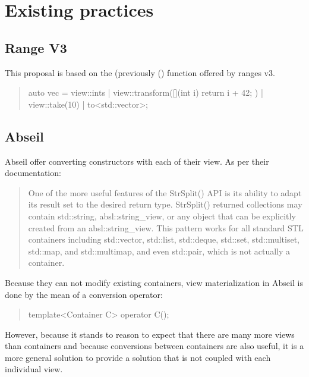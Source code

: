 \documentclass{wg21}
\begin{document}
\section{Existing practices}


\subsection{Range V3}

This proposal is based on the  (previously () function offered by ranges v3.


\begin{quote}
	\begin{colorblock}
		auto vec = view::ints
		| view::transform([](int i) {
			return i + 42;
		})
		| view::take(10)
		| to<std::vector>;
	\end{colorblock}
\end{quote}



\subsection{Abseil}

Abseil offer converting constructors with each of their view.
As per their documentation:

\begin{quote}
    One of the more useful features of the StrSplit() API is its ability to adapt its result set to the desired return type.
    StrSplit() returned collections may contain std::string, absl::string_view, or any object that can be explicitly created from an absl::string_view.
    This pattern works for all standard STL containers including std::vector,
    std::list, std::deque, std::set, std::multiset, std::map, and std::multimap, and even std::pair, which is not actually a container.
\end{quote}

Because they can not modify existing containers, view materialization in Abseil is done by the mean of a conversion operator:

\begin{quote}
\begin{colorblock}
template<Container C>
operator C();
\end{colorblock}
\end{quote}

However, because it stands to reason to expect that there are many more views than containers and because conversions between containers are also useful,
it is a more general solution to provide a solution that is not coupled with each individual view.
\end{document}
